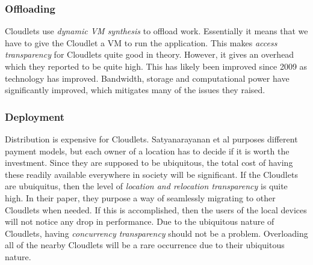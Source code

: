 \subsubsection{Offloading}
Cloudlets use \textit{dynamic VM synthesis} \cite{satyanarayanan_case_2009} to offload work. Essentially it means that we have to give the Cloudlet a VM to run the application. This makes \textit{access transparency} for Cloudlets quite good in theory. However, it gives an overhead which they reported to be quite high. This has likely been improved since 2009 as technology has improved. Bandwidth, storage and computational power have significantly improved, which mitigates many of the issues they raised.

\subsubsection{Deployment}
Distribution is expensive for Cloudlets. Satyanarayanan et al\cite{satyanarayanan_case_2009} purposes different payment models, but each owner of a location has to decide if it is worth the investment. Since they are supposed to be ubiquitous, the total cost of having these readily available everywhere in society will be significant. If the Cloudlets are ubuiquitus, then the level of \textit{location and relocation transparency} is quite high. In their paper, they purpose a way of seamlessly migrating to other Cloudlets when needed. If this is accomplished, then the users of the local devices will not notice any drop in performance. Due to the ubiquitous nature of Cloudlets, having \textit{concurrency transparency} should not be a problem. Overloading all of the nearby Cloudlets will be a rare occurrence due to their ubiquitous nature.